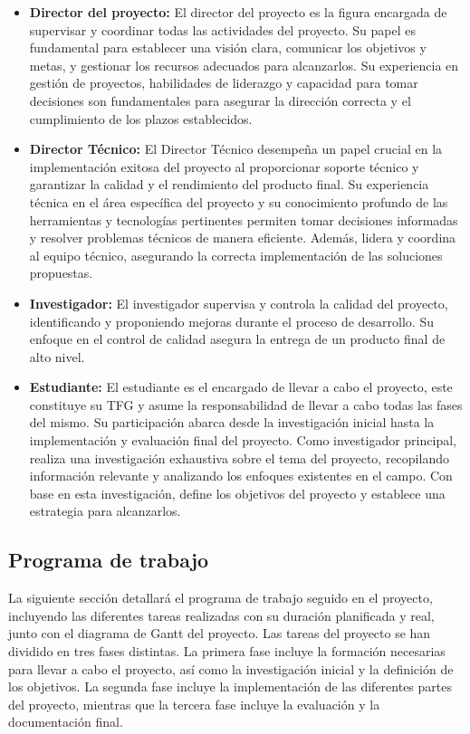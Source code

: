 \begin{itemize}
    \item \textbf{Director del proyecto:} El director del proyecto es la figura
    encargada de supervisar y coordinar todas las actividades del proyecto. Su papel 
    es fundamental para establecer una visión clara, comunicar los objetivos y metas, 
    y gestionar los recursos adecuados para alcanzarlos. Su experiencia en gestión de 
    proyectos, habilidades de liderazgo y capacidad para tomar decisiones son 
    fundamentales para asegurar la dirección correcta y el cumplimiento de los plazos 
    establecidos.
    \item \textbf{Director Técnico:} El Director Técnico desempeña un papel crucial 
    en la implementación exitosa del proyecto al proporcionar soporte técnico y 
    garantizar la calidad y el rendimiento del producto final. Su experiencia 
    técnica en el área específica del proyecto y su conocimiento profundo de las 
    herramientas y tecnologías pertinentes permiten tomar decisiones informadas 
    y resolver problemas técnicos de manera eficiente. Además, lidera y coordina al 
    equipo técnico, asegurando la correcta implementación de las soluciones propuestas.
    \item \textbf{Investigador:} El investigador supervisa y controla la calidad del 
    proyecto, identificando y proponiendo mejoras durante el proceso de desarrollo. Su 
    enfoque en el control de calidad asegura la entrega de un producto final de alto nivel.
    \item \textbf{Estudiante:} El estudiante es el encargado de llevar a cabo el proyecto,
    este constituye su TFG y asume la responsabilidad de llevar a cabo todas las fases del 
    mismo. Su participación abarca desde la investigación inicial hasta la implementación 
    y evaluación final del proyecto. Como investigador principal, realiza una investigación 
    exhaustiva sobre el tema del proyecto, recopilando información relevante y analizando 
    los enfoques existentes en el campo. Con base en esta investigación, define los objetivos 
    del proyecto y establece una estrategia para alcanzarlos.
\end{itemize}

\subsection{Programa de trabajo}
La siguiente sección detallará el programa de trabajo seguido en el proyecto, incluyendo 
las diferentes tareas realizadas con su duración planificada y real, junto con el diagrama 
de Gantt del proyecto. Las tareas del proyecto se han dividido en tres fases distintas. 
La primera fase incluye la formación necesarias para llevar a cabo el proyecto, así como
la investigación inicial y la definición de los objetivos. La segunda fase incluye la
implementación de las diferentes partes del proyecto, mientras que la tercera fase incluye
la evaluación y la documentación final.


